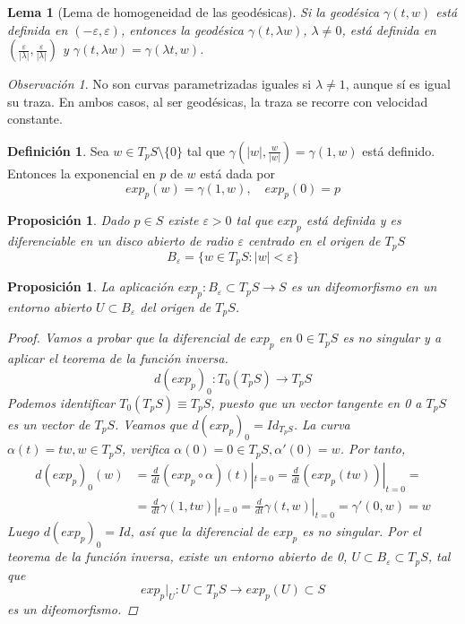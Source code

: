 \documentclass{report}
\newtheorem{lemma}[theorem]{Lema}
\newtheorem{proposition}[theorem]{Proposición}
\theoremstyle{remark}
\newtheorem*{remark}{Observación}
\theoremstyle{remark}
\theoremstyle{definition}
\newtheorem{definition}{Definición}[chapter]
\theoremstyle{definition}
\theoremstyle{definition}
\begin{document}
\begin{lemma}[Lema de homogeneidad de las geodésicas]
    Si la geodésica $\gamma(t,w)$ está definida en $(-\varepsilon, \varepsilon)$, entonces la geodésica $\gamma(t, \lambda w)$, $\lambda \neq 0$, está definida en $(\frac{\varepsilon}{|\lambda|}, \frac{\varepsilon}{|\lambda|})$ y $\gamma(t, \lambda w) = \gamma(\lambda t, w)$.
\end{lemma}

\begin{remark}
    No son curvas parametrizadas iguales si $\lambda \neq 1$, aunque sí es igual su traza.
    En ambos casos, al ser geodésicas, la traza se recorre con velocidad constante.
\end{remark}

\begin{definition}
    Sea $w \in T_pS \setminus \{0\}$ tal que $\gamma(|w|, \frac{w}{|w|}) = \gamma(1, w)$ está definido.
    Entonces la exponencial en $p$ de $w$ está dada por
    $$exp_p(w) = \gamma(1, w), \quad exp_p(0) = p$$
\end{definition}

\begin{proposition}
    Dado $p \in S$ existe $\varepsilon>0$ tal que $exp_p$ está definida y es diferenciable en un disco abierto de radio $\varepsilon$ centrado en el origen de $T_pS$
    $$B_\varepsilon = \{ w \in T_pS : |w| < \varepsilon \}$$
\end{proposition}

\begin{proposition}
    La aplicación $exp_p : B_\varepsilon \subset T_pS \to S$ es un difeomorfismo en un entorno abierto $U \subset B_\varepsilon$ del origen de $T_pS$.

    \begin{proof}
        Vamos a probar que la diferencial de $exp_p$ en $0 \in T_pS$ es no singular y a aplicar el teorema de la función inversa.
        $$d(exp_p)_0: T_0(T_pS) \to T_pS$$
        Podemos identificar $T_0(T_pS) \equiv T_pS$, puesto que un vector tangente en 0 a $T_pS$ es un vector de $T_pS$.
        Veamos que $d(exp_p)_0 = Id_{T_pS}$.
        La curva $\alpha(t) = tw, w \in T_pS$, verifica $\alpha(0) = 0 \in T_pS, \alpha'(0) = w$.
        Por tanto,
        \begin{align*}
            d(exp_p)_0(w) & = \frac{d}{dt} (exp_p \circ \alpha)(t)|_{t=0} = \frac{d}{dt} (exp_p(tw))|_{t=0} =          \\
                          & = \frac{d}{dt} \gamma(1, tw)|_{t=0} = \frac{d}{dt} \gamma(t, w)|_{t=0} = \gamma'(0, w) = w
        \end{align*}
        Luego $d(exp_p)_0 = Id$, así que la diferencial de $exp_p$ es no singular.
        Por el teorema de la función inversa, existe un entorno abierto de 0, $U \subset B_\varepsilon \subset T_pS$, tal que
        $$exp_p|_U: U \subset T_pS \to exp_p(U) \subset S$$
        es un difeomorfismo.
    \end{proof}
\end{proposition}
\end{document}
